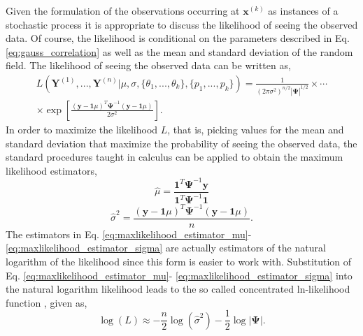 Given the formulation of the observations occurring at $\textbf{x}^{(k)}$ as instances of a stochastic process it is appropriate to discuss the likelihood of seeing the observed data. Of course, the likelihood is conditional on the parameters described in Eq. \ref{eq:gauss_correlation} as well as the mean and standard deviation of the random field. The likelihood of seeing the observed data can be written as,
\begin{eqnarray}
\label{eq:kriging_likelihood1}
   L\left(\textbf{Y}^{(1)}, ..., \textbf{Y}^{(n)} | 
    \mu, \sigma, \lbrace \theta_1,..., \theta_k\rbrace, 
    \lbrace p_1,..., p_k\rbrace\right) = 
     \frac{1}{\left(2\pi\sigma^2\right)^{n/2}|\boldsymbol{\Psi}|^{1/2}}\times\cdots  \\
   \times\exp\left[\frac{  \left(\textbf{y}-\textbf{1}\mu\right)^T
    \boldsymbol{\Psi}^{-1} \left(\textbf{y}-\textbf{1}\mu\right)}
    {2\sigma^2} \right] . \nonumber
\end{eqnarray}  
In order to maximize the likelihood $L$, that is, picking values for the mean and standard deviation that maximize the probability of seeing the observed data, the standard procedures taught in calculus can be applied to obtain the maximum likelihood estimators,
\begin{equation}
\label{eq:maxlikelihood_estimator_mu}
   \hat{\mu} = \frac{ \textbf{1}^T\boldsymbol{\Psi}^{-1}\textbf{y} }
    				   {  \textbf{1}^T\boldsymbol{\Psi}^{-1}\textbf{1} }
\end{equation}    
\begin{equation}
\label{eq:maxlikelihood_estimator_sigma}
   \hat{\sigma}^2 = \frac{  \left(\textbf{y}-\textbf{1}\mu\right)^T
    	\boldsymbol{\Psi}^{-1} \left(\textbf{y}-\textbf{1}\mu\right)}{n}.
\end{equation}
The estimators in Eq. \ref{eq:maxlikelihood_estimator_mu}- \ref{eq:maxlikelihood_estimator_sigma} are actually estimators of the natural logarithm of the likelihood since this form is easier to work with. Substitution of Eq. \ref{eq:maxlikelihood_estimator_mu}- \ref{eq:maxlikelihood_estimator_sigma} into the natural logarithm likelihood leads to the so called concentrated ln-likelihood function \cite{Forrester}, given as,
\begin{equation}
\label{eq:concentrated_likelihood}
   \log(L) \approx -\frac{n}{2}\log\left(\hat{\sigma}^2\right) -
     \frac{1}{2} \log|\boldsymbol{\Psi}|.	
\end{equation}
